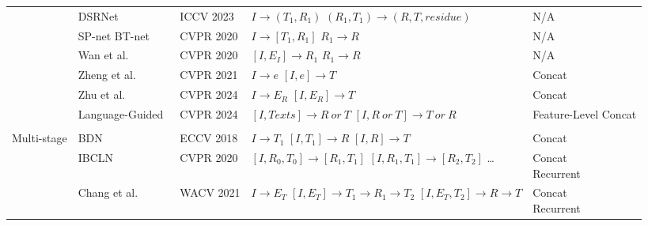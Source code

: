 \begin{table*}
\begin{tabular}{lllll}
& DSRNet~\cite{hu2023single} & ICCV 2023 & \shortstack[l]{\space \\ $I \rightarrow (T_{1}, R_{1})$ \\ $(R_{1}, T_{1}) \rightarrow (R, T, residue)$} & N/A \\ \cline{2-5}
& SP-net BT-net~\cite{kim2020single} & CVPR 2020 & \shortstack[l]{\space \\ $I \rightarrow [T_{1}, R_{1}]$ \\ $R_{1} \rightarrow R$} & N/A \\ \cline{2-5}
& Wan et al.~\cite{wan2020reflection} & CVPR 2020  & \shortstack[l]{\space \\ $[I, E_{I}] \rightarrow R_{1}$ \\ $R_{1} \rightarrow R$} & N/A \\ \cline{2-5}
& Zheng et al.~\cite{zheng2021single} & CVPR 2021 & \shortstack[l]{\space \\ $I \rightarrow e$ \\ $[I, e] \rightarrow T$} & Concat \\ \cline{2-5}
& Zhu et al.~\cite{zhu2024revisiting} & CVPR 2024 & \shortstack[l]{\space \\ $I \rightarrow E_{R}$ \\ $ [I, E_{R}] \rightarrow T$} & Concat \\ \cline{2-5}
& Language-Guided~\cite{zhong2024language} & CVPR 2024 & \shortstack[l]{\space \\ $[I, Texts] \rightarrow R\ or\ T$ \\ $[I, R\ or\ T] \rightarrow T\ or\ R$} & Feature-Level Concat
\\   \bottomrule   \\
Multi-stage
& BDN~\cite{yang2018seeing} & ECCV 2018 & \shortstack[l]{\space \\ $I \rightarrow T_{1}$ \\ $[I, T_{1}] \rightarrow R$ \\ $[I, R] \rightarrow T$ } & Concat \\ \cline{2-5}
& IBCLN~\cite{li2020single} & CVPR 2020 & \shortstack[l]{\space \\ $[I, R_{0}, T_{0}] \rightarrow [R_{1}, T_{1}]$ \\ $[I, R_{1}, T_{1}] \rightarrow [R_{2}, T_{2}]$ \\ \ldots} & \shortstack[l]{Concat \\ Recurrent} \\ \cline{2-5}
& Chang et al.~\cite{chang2021single} & WACV 2021 & \shortstack[l]{\space \\ $I \rightarrow E_{T}$ \\ $[I, E_{T}] \rightarrow T_{1} \rightarrow R_{1} \rightarrow T_{2}$ \\ $[I, E_{T}, T_{2}] \rightarrow R \rightarrow T$} & \shortstack[l]{Concat \\ Recurrent} \\ \cline{2-5}

\end{tabular}
\end{table*}

